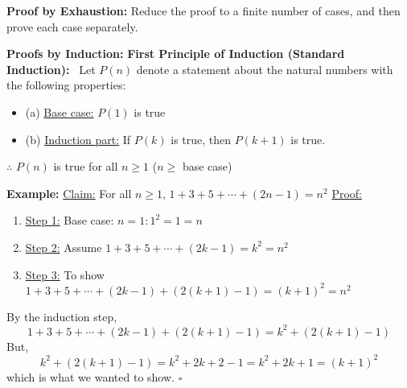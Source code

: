 \documentclass[letterpaper]{article}
\begin{document}
\noindent \textbf{Proof by Exhaustion:} Reduce the proof to a finite number of cases, and then prove each case separately.

\noindent \textbf{Proofs by Induction:}
    \newline\newline
    \noindent \textbf{First Principle of Induction (Standard Induction):}~ Let $P(n)$ denote a statement about the natural numbers with the following properties:
        \begin{itemize}
            \item[] (a) \underline{Base case:} $P(1)$ is true
            \item[] (b) \underline{Induction part:} If $P(k)$ is true, then $P(k+1)$ is true.
        \end{itemize}
$\therefore$ $P(n)$ is true for all $n \geq 1$ ($n \geq$ base case)

\textbf{Example:} \newline
    \underline{Claim:}  For all $n \geq 1$, $1+3+5+\dotsb+(2n-1)=n^2$
    \newline
    \underline{Proof:}
    \begin{enumerate}
        \item[] \underline{Step 1:} Base case: $n=1: 1^2 = 1 = n$
        \item[] \underline{Step 2:} Assume $1+3+5+\dotsb+(2k-1)=k^2=n^2$
        \item[] \underline{Step 3:} To show $1+3+5+\dotsb+(2k-1)+(2(k+1)-1)=(k+1)^2=n^2$
    \end{enumerate}
    By the induction step,
    \begin{equation*}
        1+3+5+\dotsb+(2k-1)+(2(k+1)-1) = k^2+(2(k+1)-1)
    \end{equation*}
    But,
    \begin{equation*}
        k^2 + (2(k+1)-1) = k^2+2k+2-1 = k^2+2k+1 = (k+1)^2
    \end{equation*}
    which is what we wanted to show. $\square$
\end{document}
